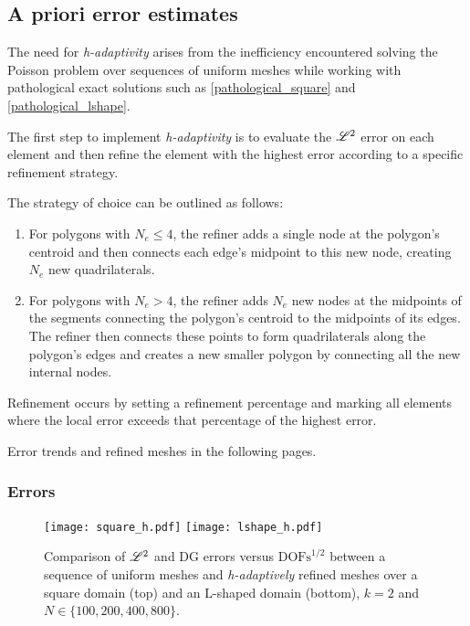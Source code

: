 \subsection{A priori error estimates}

The need for \textit{h-adaptivity} arises from the inefficiency encountered solving the Poisson problem over sequences of uniform meshes while working with pathological exact solutions such as \eqref{pathological_square} and \eqref{pathological_lshape}.

The first step to implement \textit{h-adaptivity} is to evaluate the $\mathscr{L}^2$ error on each element and then refine the element with the highest error according to a specific refinement strategy.

The strategy of choice can be outlined as follows:

\begin{enumerate}
    \item For polygons with $N_e \leq 4$, the refiner adds a single node at the polygon's centroid and then connects each edge's midpoint to this new node, creating $N_e$ new quadrilaterals.
    \item For polygons with $N_e > 4$, the refiner adds $N_e$ new nodes at the midpoints of the segments connecting the polygon's centroid to the midpoints of its edges. The refiner then connects these points to form quadrilaterals along the polygon's edges and creates a new smaller polygon by connecting all the new internal nodes.
\end{enumerate}

Refinement occurs by setting a refinement percentage and marking all elements where the local error exceeds that percentage of the highest error.

Error trends and refined meshes in the following pages.

\newpage
\subsubsection{Errors}

\begin{figure}[!ht]
	\centering
	\texttt{[image: square\_h.pdf]}
    \texttt{[image: lshape\_h.pdf]}
	\caption{Comparison of $\mathscr{L}^2$ and DG errors versus $\text{DOFs}^{1/2}$ between a sequence of uniform meshes and \textit{h-adaptively} refined meshes over a square domain (top) and an L-shaped domain (bottom), $k = 2$ and $N \in \{100, 200, 400, 800\}$.}
\end{figure}

